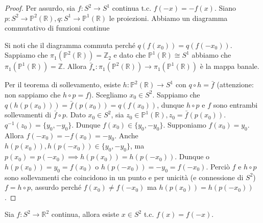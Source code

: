 \begin{proof}
  Per assurdo, sia $f:S^2 \longrightarrow S^1$ continua t.c. $f(-x)=-f(x)$. Siano $p:S^2 \longrightarrow \mathbb{P}^2(\mathbb{R}), q:S^1 \longrightarrow \mathbb{P}^1(\mathbb{R})$ le proiezioni. Abbiamo un diagramma commutativo di funzioni continue
  \begin{center}
   \end{center}
  Si noti che il diagramma commuta perché $q(f(x_0))=q(f(-x_0))$. Sappiamo che $\pi_1(\mathbb{P}^2(\mathbb{R}))=\mathbb{Z}_2$ e dato che $\mathbb{P}^1(\mathbb{R}) \cong S^1$ abbiamo che $\pi_1(\mathbb{P}^1(\mathbb{R}))=\mathbb{Z}$.
  Allora $\bar{f}_{\star}:\pi_1(\mathbb{P}^2(\mathbb{R})) \longrightarrow \pi_1(\mathbb{P}^1(\mathbb{R}))$ è la mappa banale.
  \begin{center}
  \end{center}
  Per il teorema di sollevamento, esiste $h:\mathbb{P}^2(\mathbb{R}) \longrightarrow S^1$ con $q \circ h=\bar{f}$ (attenzione: non sappiamo che $h \circ p=f$). Scegliamo $x_0 \in S^2$. Sappiamo che $q(h(p(x_0)))=\bar{f}(p(x_0))=q(f(x_0))$, dunque $h \circ p$ e $f$ sono entrambi sollevamenti di $\bar{f} \circ p$.
  Dato $x_0 \in S^2$, sia $z_0 \in \mathbb{P}^1(\mathbb{R}), z_0=\bar{f}(p(x_0))$. $q^{-1}(z_0)=\{y_0, -y_0\}$. Dunque $f(x_0) \in \{y_0, -y_0\}$. Supponiamo $f(x_0)=y_0$. Allora $f(-x_0)=-f(x_0)=-y_0$.
  Anche $h(p(x_0)), h(p(-x_0)) \in \{y_0, -y_0\}$, ma $p(x_0)=p(-x_0) \implies h(p(x_0))=h(p(-x_0))$. Dunque o $h(p(x_0))=y_0=f(x_0)$ o $h(p(-x_0))=-y_0=f(-x_0)$. Perciò $f$ e $h \circ p$ sono sollevamenti che coincidono in un punto e per unicità (e connessione di $S^2$) $f=h \circ p$, assurdo perché $f(x_0) \not=f(-x_0)$ ma $h(p(x_0))=h(p(-x_0))$.
\end{proof}

\begin{cor}
  Sia $f: S^2 \longrightarrow \mathbb{R}^2$ continua, allora esiste $x \in S^2$ t.c. $f(x)=f(-x)$.
\end{cor}

